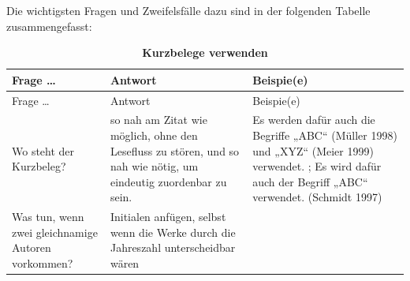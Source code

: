 \documentclass[]{book}
\theoremstyle{definition}
\theoremstyle{definition}
\theoremstyle{definition}
\theoremstyle{remark}
\begin{document}
Die wichtigsten Fragen und Zweifelsfälle dazu sind in der folgenden
Tabelle zusammengefasst:

\begin{longtable}[]{@{}lll@{}}
\caption{\textbf{\label{tab:zitieren3} Kurzbelege verwenden}}\tabularnewline
\toprule
\begin{minipage}[b]{0.26\columnwidth}\raggedright\strut
Frage \ldots{}\strut
\end{minipage} & \begin{minipage}[b]{0.33\columnwidth}\raggedright\strut
Antwort\strut
\end{minipage} & \begin{minipage}[b]{0.32\columnwidth}\raggedright\strut
Beispie(e)\strut
\end{minipage}\tabularnewline
\midrule
\endfirsthead
\toprule
\begin{minipage}[b]{0.26\columnwidth}\raggedright\strut
Frage \ldots{}\strut
\end{minipage} & \begin{minipage}[b]{0.33\columnwidth}\raggedright\strut
Antwort\strut
\end{minipage} & \begin{minipage}[b]{0.32\columnwidth}\raggedright\strut
Beispie(e)\strut
\end{minipage}\tabularnewline
\midrule
\endhead
\begin{minipage}[t]{0.26\columnwidth}\raggedright\strut
Wo steht der Kurzbeleg?\strut
\end{minipage} & \begin{minipage}[t]{0.33\columnwidth}\raggedright\strut
so nah am Zitat wie möglich, ohne den Lesefluss zu stören, und so nah
wie nötig, um eindeutig zuordenbar zu sein.\strut
\end{minipage} & \begin{minipage}[t]{0.32\columnwidth}\raggedright\strut
Es werden dafür auch die Begriffe „ABC`` (Müller 1998) und „XYZ`` (Meier
1999) verwendet. ; Es wird dafür auch der Begriff „ABC`` verwendet.
(Schmidt 1997) \vspace{-6mm}\strut
\end{minipage}\tabularnewline
\begin{minipage}[t]{0.26\columnwidth}\raggedright\strut
Was tun, wenn zwei gleichnamige Autoren vorkommen?\strut
\end{minipage} & \begin{minipage}[t]{0.33\columnwidth}\raggedright\strut
Initialen anfügen, selbst wenn die Werke durch die Jahreszahl
unterscheidbar wären\strut

\end{minipage}
\end{longtable}
\end{document}
